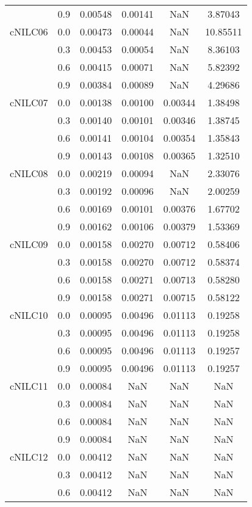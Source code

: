 \begin{longtable}{cccccc}
        & 0.9 & 0.00548 & 0.00141 & NaN & 3.87043 \\
cNILC06 & 0.0 & 0.00473 & 0.00044 & NaN & 10.85511 \\
        & 0.3 & 0.00453 & 0.00054 & NaN & 8.36103 \\
        & 0.6 & 0.00415 & 0.00071 & NaN & 5.82392 \\
        & 0.9 & 0.00384 & 0.00089 & NaN & 4.29686 \\
cNILC07 & 0.0 & 0.00138 & 0.00100 & 0.00344 & 1.38498 \\
        & 0.3 & 0.00140 & 0.00101 & 0.00346 & 1.38745 \\
        & 0.6 & 0.00141 & 0.00104 & 0.00354 & 1.35843 \\
        & 0.9 & 0.00143 & 0.00108 & 0.00365 & 1.32510 \\
cNILC08 & 0.0 & 0.00219 & 0.00094 & NaN & 2.33076 \\
        & 0.3 & 0.00192 & 0.00096 & NaN & 2.00259 \\
        & 0.6 & 0.00169 & 0.00101 & 0.00376 & 1.67702 \\
        & 0.9 & 0.00162 & 0.00106 & 0.00379 & 1.53369 \\
cNILC09 & 0.0 & 0.00158 & 0.00270 & 0.00712 & 0.58406 \\
        & 0.3 & 0.00158 & 0.00270 & 0.00712 & 0.58374 \\
        & 0.6 & 0.00158 & 0.00271 & 0.00713 & 0.58280 \\
        & 0.9 & 0.00158 & 0.00271 & 0.00715 & 0.58122 \\
cNILC10 & 0.0 & 0.00095 & 0.00496 & 0.01113 & 0.19258 \\
        & 0.3 & 0.00095 & 0.00496 & 0.01113 & 0.19258 \\
        & 0.6 & 0.00095 & 0.00496 & 0.01113 & 0.19257 \\
        & 0.9 & 0.00095 & 0.00496 & 0.01113 & 0.19257 \\
cNILC11 & 0.0 & 0.00084 & NaN & NaN & NaN \\
        & 0.3 & 0.00084 & NaN & NaN & NaN \\
        & 0.6 & 0.00084 & NaN & NaN & NaN \\
        & 0.9 & 0.00084 & NaN & NaN & NaN \\
cNILC12 & 0.0 & 0.00412 & NaN & NaN & NaN \\
        & 0.3 & 0.00412 & NaN & NaN & NaN \\
        & 0.6 & 0.00412 & NaN & NaN & NaN \\

\end{longtable}
